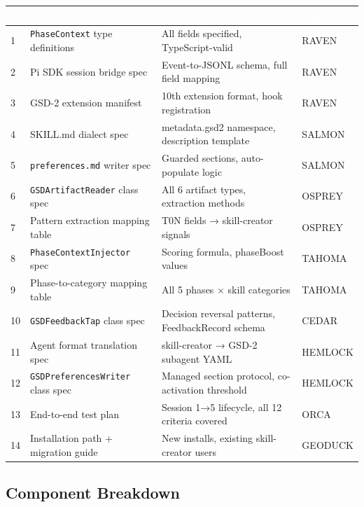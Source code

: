 \documentclass[11pt,letterpaper]{article}
\newcommand{\tableheader}[1]{\textbf{\sffamily\textcolor{white}{#1}}}
\begin{document}
\begin{center}
\begin{tabularx}{\textwidth}{C{0.5cm}L{4.5cm}L{3cm}X}
\toprule
{}
\tableheader{\#} & \tableheader{Deliverable} & \tableheader{Criteria} & \tableheader{Agent} \\
 & \texttt{PhaseContext} type definitions & All fields specified, TypeScript-valid & RAVEN \\
2 & Pi SDK session bridge spec & Event-to-JSONL schema, full field mapping & RAVEN \\
3 & GSD-2 extension manifest & 10th extension format, hook registration & RAVEN \\
4 & SKILL.md dialect spec & metadata.gsd2 namespace, description template & SALMON \\
5 & \texttt{preferences.md} writer spec & Guarded sections, auto-populate logic & SALMON \\
6 & \texttt{GSDArtifactReader} class spec & All 6 artifact types, extraction methods & OSPREY \\
7 & Pattern extraction mapping table & T0N fields → skill-creator signals & OSPREY \\
8 & \texttt{PhaseContextInjector} spec & Scoring formula, phaseBoost values & TAHOMA \\
9 & Phase-to-category mapping table & All 5 phases × skill categories & TAHOMA \\
10 & \texttt{GSDFeedbackTap} class spec & Decision reversal patterns, FeedbackRecord schema & CEDAR \\
11 & Agent format translation spec & skill-creator → GSD-2 subagent YAML & HEMLOCK \\
12 & \texttt{GSDPreferencesWriter} class spec & Managed section protocol, co-activation threshold & HEMLOCK \\
13 & End-to-end test plan & Session 1→5 lifecycle, all 12 criteria covered & ORCA \\
14 & Installation path + migration guide & New installs, existing skill-creator users & GEODUCK \\
\bottomrule
\end{tabularx}
\end{center}

\subsection{Component Breakdown}
\end{document}

